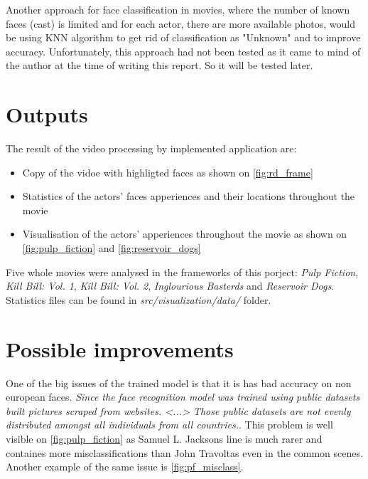 \documentclass[hidelinks, english]{mvi-report}
\begin{document}
    Another approach for face classification in movies, where the number of known faces (cast) is limited and for each
    actor, there are more available photos, would be using KNN algorithm to get rid of classification as "Unknown" and to
    improve accuracy. Unfortunately, this approach had not been tested as it came to mind of the author at the time of
    writing this report. So it will be tested later.

    \section{Outputs}

    The result of the video processing by implemented application are:

    \begin{itemize}
        \item Copy of the vidoe with highligted faces as shown on \cref{fig:rd_frame}
        \item Statistics of the actors' faces apperiences and their locations throughout the movie
        \item Visualisation of the actors' apperiences throughout the movie as shown on \cref{fig:pulp_fiction} and
        \cref{fig:reservoir_dogs}
    \end{itemize}

    Five whole movies were analysed in the frameworks of this porject: \textit{Pulp Fiction}, \textit{Kill Bill: Vol. 1},
    \textit{Kill Bill: Vol. 2}, \textit{Inglourious Basterds} and \textit{Reservoir Dogs}. Statistics files can be found in
    \textit{src/visualization/data/} folder.

    \section{Possible improvements}

    One of the big issues of the trained model is that it is has bad accuracy on non european faces.
    \textit{Since the face recognition model was trained using public datasets built pictures scraped from websites. <...>
    Those public datasets are not evenly distributed amongst all individuals from all
    countries.}\cite{face_recognition_error}. This problem is well visible on \cref{fig:pulp_fiction} as Samuel L. Jacksons
    line is much rarer and containes more misclassifications than John Travoltas even in the common scenes. Another example
    of the same issue is \cref{fig:pf_misclass}.
\end{document}
